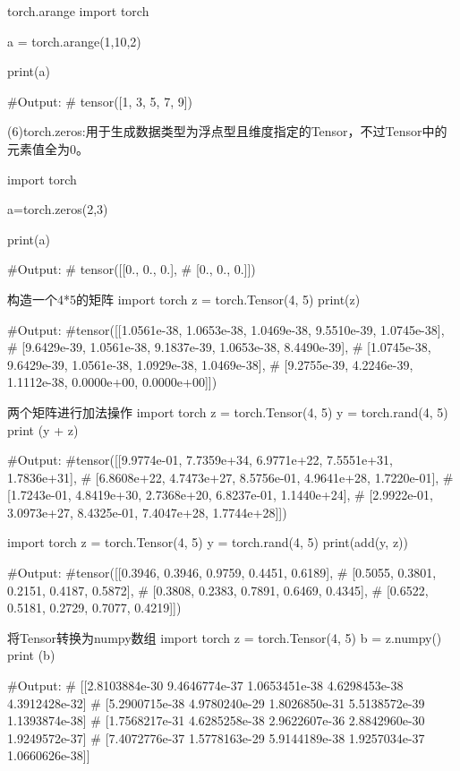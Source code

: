 \documentclass[openbib]{article}
\begin{document}
\begin{Python}{torch.arange}
	import torch
	
	a = torch.arange(1,10,2)
	
	print(a)
	
	#Output:
	#		tensor([1, 3, 5, 7, 9])
\end{Python}
(6)torch.zeros:用于生成数据类型为浮点型且维度指定的Tensor，不过Tensor中的元素值全为0。
\begin{Python}
	import torch
	
	a=torch.zeros(2,3)
	
	print(a)
	
	#Output:
	#		tensor([[0., 0., 0.],
	#				[0., 0., 0.]])
\end{Python}
\begin{Python}{构造一个4*5的矩阵}
	import torch
	z = torch.Tensor(4, 5)
	print(z)
	
	#Output:
	#tensor([[1.0561e-38, 1.0653e-38, 1.0469e-38, 9.5510e-39, 1.0745e-38],
	#		[9.6429e-39, 1.0561e-38, 9.1837e-39, 1.0653e-38, 8.4490e-39],
	#		[1.0745e-38, 9.6429e-39, 1.0561e-38, 1.0929e-38, 1.0469e-38],
	#		[9.2755e-39, 4.2246e-39, 1.1112e-38, 0.0000e+00, 0.0000e+00]])
	
\end{Python}

\begin{Python}{两个矩阵进行加法操作}
	import torch
	z = torch.Tensor(4, 5)
	y = torch.rand(4, 5)
	print (y + z)
	
	#Output:
	#tensor([[9.9774e-01, 7.7359e+34, 6.9771e+22, 7.5551e+31, 1.7836e+31],
	#		[6.8608e+22, 4.7473e+27, 8.5756e-01, 4.9641e+28, 1.7220e-01],
	#		[1.7243e-01, 4.8419e+30, 2.7368e+20, 6.8237e-01, 1.1440e+24],
	#		[2.9922e-01, 3.0973e+27, 8.4325e-01, 7.4047e+28, 1.7744e+28]])
	
	import torch
	z = torch.Tensor(4, 5)
	y = torch.rand(4, 5)
	print(add(y, z))
	
	#Output:
	#tensor([[0.3946, 0.3946, 0.9759, 0.4451, 0.6189],
	#		[0.5055, 0.3801, 0.2151, 0.4187, 0.5872],
	#		[0.3808, 0.2383, 0.7891, 0.6469, 0.4345],
	#		[0.6522, 0.5181, 0.2729, 0.7077, 0.4219]])
	
\end{Python}

\begin{Python}{将Tensor转换为numpy数组}
	import torch
	z = torch.Tensor(4, 5)
	b = z.numpy()
	print (b)
	
	#Output:
	#		[[2.8103884e-30 9.4646774e-37 1.0653451e-38 4.6298453e-38 4.3912428e-32]
	#		[5.2900715e-38 4.9780240e-29 1.8026850e-31 5.5138572e-39 1.1393874e-38]
	#		[1.7568217e-31 4.6285258e-38 2.9622607e-36 2.8842960e-30 1.9249572e-37]
	#		[7.4072776e-37 1.5778163e-29 5.9144189e-38 1.9257034e-37 1.0660626e-38]]
\end{Python}
\end{document}
